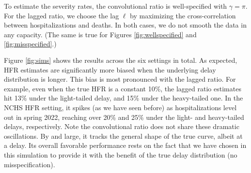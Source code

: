 \documentclass{article}
\begin{document}
To estimate the severity rates, the convolutional ratio is well-specified with $\gamma=\pi$.
For the lagged ratio, we choose the lag $\ell$ by maximizing the
cross-correlation between hospitalizations and deaths. 
In both cases, we do not smooth the data in any capacity. (The same is true for Figures \ref{fig:wellspecified} and \ref{fig:misspecified}.)
 
Figure \ref{fig:sims} shows the results across the six settings in total. As
expected, HFR estimates are significantly more biased when the underlying delay
distribution is longer. This bias is most pronounced with the lagged ratio. For example, even when the true HFR is a constant 10\%, the lagged ratio estimates
hit 13\% under the light-tailed delay, and 15\% under the heavy-tailed one. In
the NCHS HFR setting, it spikes (as we have seen before) as hospitalizations
level out in spring 2022, reaching over 20\% and 25\% under the light- and 
heavy-tailed delays, respectively. Note the convolutional ratio does not share
these dramatic oscillations. By and large, it tracks the general shape of the
true curve, albeit at a delay.
Its overall favorable performance rests on the fact that we have chosen in this
simulation to provide it with the benefit of the true delay distribution (no
misspecification).   
\end{document}
